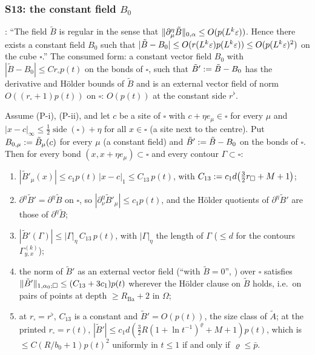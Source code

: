 \subsubsection{S13: the constant field $B_0$}\label{sup3:ssec:S13}

\cite[p.~433]{Ba3}: ``The field $\tilde B$ is regular in the sense that $\lVert \partial^\eta_\mu\tilde B\rVert_{0,\alpha}\le O(p(L^k\varepsilon))$. Hence there exists a constant field $B_0$ such that $|\tilde B-B_0|\le O(r(L^k\varepsilon)p(L^k\varepsilon))\le O(p(L^k\varepsilon)^2)$ on the cube $\square$.'' The consumed form: a constant vector field $B_0$ with $|\tilde B-B_0|\le Cr_\square p(t)$ on the bonds of $\square$, such that $\tilde B':=\tilde B-B_0$ has the derivative and H\"older bounds of $\tilde B$ and is an external vector field of norm \cite[(1.32)]{Ba3} $O((r_\square+1)p(t))$ on $\square$: $O(p(t))$ at the constant side $r^\flat$.

\begin{lemma}\label{sup3:lem:S13}
Assume (P-i), (P-ii), and let $c$ be a site of $\square$ with $c+\eta e_\mu\in\square$ for every $\mu$ and $|x-c|_\infty\le\frac12\operatorname{side}(\square)+\eta$ for all $x\in\square$ (a site next to the centre). Put $B_{0,\mu}:=\tilde B_\mu(c)$ for every $\mu$ (a constant field) and $\tilde B':=\tilde B-B_0$ on the bonds of $\square$. Then for every bond $(x,x+\eta e_\mu)\subset\square$ and every contour $\Gamma\subset\square$:
\begin{enumerate}[label=\textup{(\alph*)},nosep,leftmargin=*]
\item $|\tilde B'_\mu(x)|\le c_1p(t)\,|x-c|_1\le C_{13}\,p(t)$, with $C_{13}:= c_1d\big(\tfrac32r_\square+M+1\big)$;
\item $\partial^\eta\tilde B'=\partial^\eta\tilde B$ on $\square$, so $|\partial^\eta_\nu\tilde B'_\mu|\le c_1p(t)$, and the H\"older quotients of $\partial^\eta\tilde B'$ are those of $\partial^\eta\tilde B$;
\item $|\tilde B'(\Gamma)|\le|\Gamma|_\eta\,C_{13}\,p(t)$, with $|\Gamma|_\eta$ the length of $\Gamma$ ($\le d$ for the contours $\Gamma^{(k)}_{y,x}$);
\item the norm \cite[(1.32)]{Ba3} of $\tilde B'$ as an external vector field (``with $\tilde B=0$'', \cite[p.~420]{Ba3}) over $\square$ satisfies $\lVert \tilde B'\rVert_{1,\alpha_0;\square}\le(C_{13}+3c_1)p(t)$ wherever the H\"older clause on $\tilde B$ holds, i.e.\ on pairs of points at depth $\ge R_{\mathrm{Ba}}+2$ in $\Omega$;
\item at $r_\square=r^\flat$, $C_{13}$ is a constant and $\tilde B'=O(p(t))$, the size class of $\tilde A$; at the printed $r_\square=r(t)$, $|\tilde B'|\le c_1d(\tfrac32R(1+\ln t^{-1})^{\varrho}+M+1)p(t)$, which is $\le C(R/b_0+1)p(t)^2$ uniformly in $t\le1$ if and only if $\varrho\le\bar p$.
\end{enumerate}
\end{lemma}

